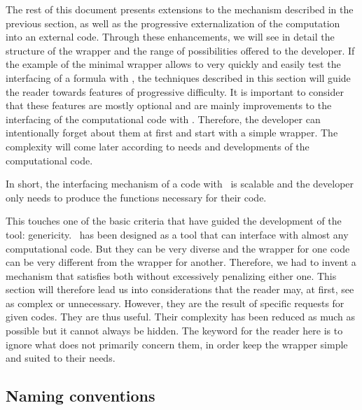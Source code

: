 
The rest of this document presents extensions to the mechanism described in the previous section, as well as the progressive externalization of the computation into an external code. Through these enhancements, we will see in detail the structure of the wrapper and the range of possibilities offered to the developer. If the example of the minimal wrapper allows to very quickly and easily test the interfacing of a formula with \OT , the techniques described in this section will guide the reader towards features of progressive difficulty. It is important to consider that these features are mostly optional and are mainly improvements to the interfacing of the computational code with \OT . Therefore, the developer can intentionally forget about them at first and start with a simple wrapper. The complexity will come later according to needs and developments of the computational code.

In short, the interfacing mechanism of a code with \OT\ is scalable and the developer only needs to produce the functions necessary for their code.

This touches one of the basic criteria that have guided the development of the tool: genericity. \OT\ has been designed as a tool that can interface with almost any computational code. But they can be very diverse and the wrapper for one code can be very different from the wrapper for another. Therefore, we had to invent a mechanism that satisfies both without excessively penalizing either one. This section will therefore lead us into considerations that the reader may, at first, see as complex or unnecessary. However, they are the result of specific requests for given codes. They are thus useful. Their complexity has been reduced as much as possible but it cannot always be hidden. The keyword for the reader here is to ignore what does not primarily concern them, in order keep the wrapper simple and suited to their needs.

\subsection{Naming conventions}


